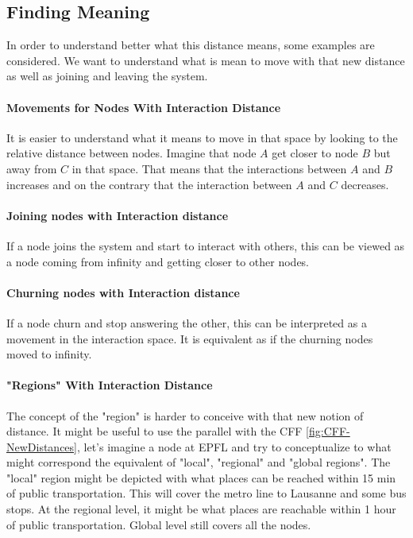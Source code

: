 \documentclass[a4paper,11pt,oneside]{report}
\begin{document}
\subsection{Finding Meaning}
In order to understand better what this distance means, some examples are
considered. We want to understand what is mean to move with that new distance as
well as joining and leaving the system. 

\paragraph{Movements for Nodes With Interaction Distance}
It is easier to understand what it means to move in that space by looking to
the relative distance between nodes. Imagine that node $A$ get closer to node
$B$ but away from $C$ in that space. That means that the interactions between
$A$ and $B$ increases and on the contrary that the interaction between $A$ and
$C$ decreases.

\paragraph{Joining nodes with Interaction distance}
If a node joins the system and start to interact with others, this can be
viewed as a node coming from infinity and getting closer to other
nodes.

\paragraph{Churning nodes with Interaction distance}
If a node churn and stop answering the other, this can be interpreted as a
movement in the interaction space. It is equivalent as if the churning nodes moved
to infinity.  

\paragraph{"Regions" With Interaction Distance} \label{par:section-example}
The concept of the "region" is harder to conceive with that new notion of
distance. It might be useful to use the parallel with the CFF
\autoref{fig:CFF-NewDistances}, let's imagine a node at EPFL and try to
conceptualize to what might correspond the equivalent of "local", "regional"
and "global regions". The "local" region might be depicted with what places can
be reached within 15 min of public transportation. This will cover the metro
line to Lausanne and some bus stops.  At the regional level, it might be what
places are reachable within 1 hour of public transportation. Global level still
covers all the nodes.
\end{document}
